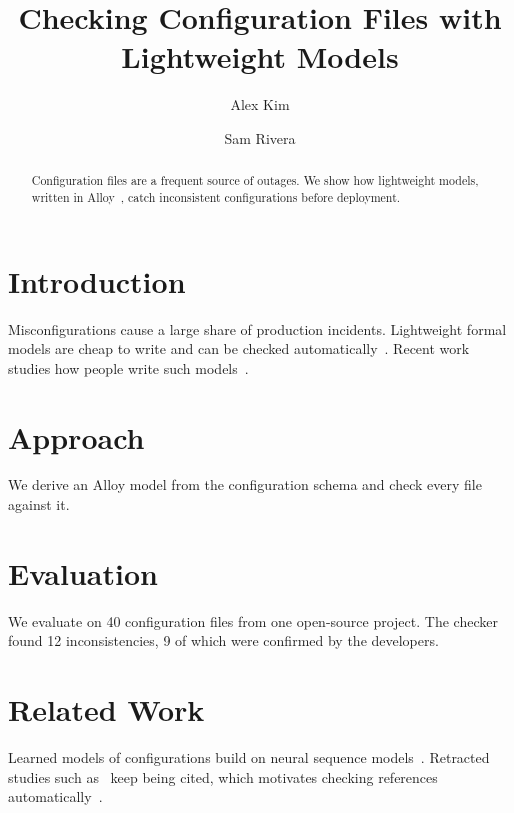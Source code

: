 \documentclass{article}
\title{Checking Configuration Files with Lightweight Models}
\author{Alex Kim \and Sam Rivera}
\begin{document}
\maketitle

\begin{abstract}
Configuration files are a frequent source of outages. We show how lightweight models,
written in Alloy~\cite{jackson2002alloy}, catch inconsistent configurations before deployment.
\end{abstract}

\section{Introduction}
Misconfigurations cause a large share of production incidents. Lightweight formal models
are cheap to write and can be checked automatically~\cite{Jackson02}. Recent work studies how
people write such models~\cite{jovanovic2024rightwrongunderstanding}.

\section{Approach}
We derive an Alloy model from the configuration schema and check every file against it.

\section{Evaluation}
We evaluate on 40 configuration files from one open-source project.
The checker found 12 inconsistencies, 9 of which were confirmed by the developers.

\section{Related Work}
Learned models of configurations build on neural sequence models~\cite{vaswani2017attention}.
Retracted studies such as~\cite{wakefield1998} keep being cited, which motivates checking
references automatically~\cite{jackson2002aloy}.



\end{document}
